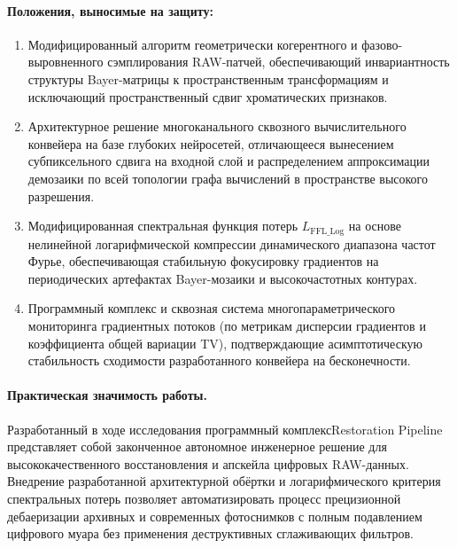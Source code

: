 \documentclass[12pt,a4paper]{article}
\begin{document}
\begin{algorithm}[H]
\BlankLine
{}

\BlankLine
{}
\caption{Синхронное извлечение элементов датасета с фазовой и геометрической когерентностью}
\end{algorithm}

\paragraph{Положения, выносимые на защиту:}
\begin{enumerate}
    \item Модифицированный алгоритм геометрически когерентного и фазово-выровненного сэмплирования RAW-патчей, обеспечивающий инвариантность структуры Bayer-матрицы к пространственным трансформациям и исключающий пространственный сдвиг хроматических признаков.
    \item Архитектурное решение многоканального сквозного вычислительного конвейера на базе глубоких нейросетей, отличающееся вынесением субпиксельного сдвига на входной слой и распределением аппроксимации демозаики по всей топологии графа вычислений в пространстве высокого разрешения.
    \item Модифицированная спектральная функция потерь $L_{\text{FFL\_Log}}$ на основе нелинейной логарифмической компрессии динамического диапазона частот Фурье, обеспечивающая стабильную фокусировку градиентов на периодических артефактах Bayer-мозаики и высокочастотных контурах.
    \item Программный комплекс и сквозная система многопараметрического мониторинга градиентных потоков (по метрикам дисперсии градиентов и коэффициента общей вариации TV), подтверждающие асимптотическую стабильность сходимости разработанного конвейера на бесконечности.
\end{enumerate}

\paragraph{Практическая значимость работы.} 
Разработанный в ходе исследования программный комплексRestoration Pipeline представляет собой законченное автономное инженерное решение для высококачественного восстановления и апскейла цифровых RAW-данных. Внедрение разработанной архитектурной обёртки и логарифмического критерия спектральных потерь позволяет автоматизировать процесс прецизионной дебаеризации архивных и современных фотоснимков с полным подавлением цифрового муара без применения деструктивных сглаживающих фильтров. 
\end{document}
